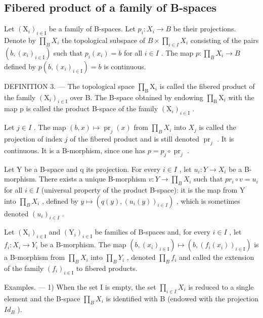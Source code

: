 \subsection{Fibered product of a family of B-spaces}

Let \((\mathrm{X}_{i})_{i\in\mathrm{I}}\) be a family of B-spaces. Let \(p_{i}\colon X_{i}\to B\) be their projections. Denote by \(\prod_{B}X_{i}\) the topological subspace of \(B\times\prod_{i\in I}X_{i}\) consisting of the pairs \((b,(x_{i})_{i\in\mathrm{I}})\) such that \(p_{i}(x_{i})=b\) for all \(i\in I\) . The map \(p\colon\prod_{B}X_{i}\to B\) defined by \(p(b,(x_{i})_{i\in\mathrm{I}})=b\) is continuous.

DEFINITION 3. --- The topological space \(\prod_{\mathrm{B}} \mathrm{X}_i\) is called the fibered product of the family \((\mathrm{X}_i)_{i \in \mathrm{I}}\) over B. The B-space obtained by endowing \(\prod_{\mathrm{B}} \mathrm{X}_i\) with the map p is called the product B-space of the family \((\mathrm{X}_i)_{i \in \mathrm{I}}\) .

Let \(j \in I\) . The map \((b, x) \mapsto \operatorname{pr}_j(x)\) from \(\prod_B X_i\) into \(X_j\) is called the projection of index \(j\) of the fibered product and is still denoted \(\operatorname{pr}_j\) . It is continuous. It is a B-morphism, since one has \(p = p_j \circ \operatorname{pr}_j\) .

Let Y be a B-space and q its projection. For every \(i \in I\) , let \(u_i \colon Y \to X_i\) be a B-morphism. There exists a unique B-morphism \(v \colon Y \to \prod_{B} X_i\) such that \(pr_i \circ v = u_i\) for all \(i \in I\) (universal property of the product B-space): it is the map from Y into \(\prod_{B} X_i\) , defined by \(y \mapsto (q(y), (u_i(y))_{i \in I})\) , which is sometimes denoted \((u_i)_{i \in I}\) .

Let \((\mathrm{X}_{i})_{i\in\mathrm{I}}\) and \((\mathrm{Y}_{i})_{i\in\mathrm{I}}\) be families of B-spaces and, for every \(i\in I\) , let \(f_{i}\colon X_{i}\to Y_{i}\) be a B-morphism. The map \((b,(x_{i})_{i\in\mathrm{I}})\mapsto(b,(f_{i}(x_{i}))_{i\in\mathrm{I}})\) is a B-morphism from \(\prod_{B}X_{i}\) into \(\prod_{B}Y_{i}\) , denoted \(\prod_{B}f_{i}\) and called the extension of the family \((f_{i})_{i\in\mathrm{I}}\) to fibered products.

Examples. --- 1) When the set I is empty, the set \(\prod_{i\in I}X_i\) is reduced to a single element and the B-space \(\prod_{B}X_{i}\) is identified with B (endowed with the projection \(Id_B\) ).

